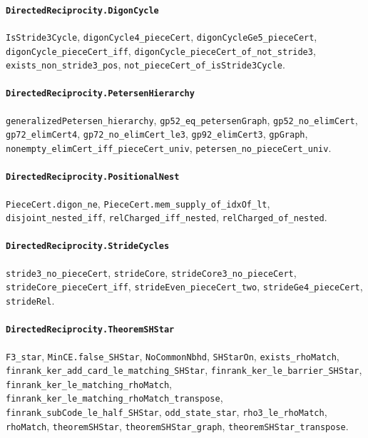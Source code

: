 \paragraph{\texttt{DirectedReciprocity.DigonCycle}}
{\small\raggedright \texttt{IsStride3Cycle}, \texttt{digonCycle4\_pieceCert}, \texttt{digonCycleGe5\_pieceCert}, \texttt{digonCycle\_pieceCert\_iff}, \texttt{digonCycle\_pieceCert\_of\_not\_stride3}, \texttt{exists\_non\_stride3\_pos}, \texttt{not\_pieceCert\_of\_isStride3Cycle}.\par}

\paragraph{\texttt{DirectedReciprocity.PetersenHierarchy}}
{\small\raggedright \texttt{generalizedPetersen\_hierarchy}, \texttt{gp52\_eq\_petersenGraph}, \texttt{gp52\_no\_elimCert}, \texttt{gp72\_elimCert4}, \texttt{gp72\_no\_elimCert\_le3}, \texttt{gp92\_elimCert3}, \texttt{gpGraph}, \texttt{nonempty\_elimCert\_iff\_pieceCert\_univ}, \texttt{petersen\_no\_pieceCert\_univ}.\par}

\paragraph{\texttt{DirectedReciprocity.PositionalNest}}
{\small\raggedright \texttt{PieceCert.digon\_ne}, \texttt{PieceCert.mem\_supply\_of\_idxOf\_lt}, \texttt{disjoint\_nested\_iff}, \texttt{relCharged\_iff\_nested}, \texttt{relCharged\_of\_nested}.\par}

\paragraph{\texttt{DirectedReciprocity.StrideCycles}}
{\small\raggedright \texttt{stride3\_no\_pieceCert}, \texttt{strideCore}, \texttt{strideCore3\_no\_pieceCert}, \texttt{strideCore\_pieceCert\_iff}, \texttt{strideEven\_pieceCert\_two}, \texttt{strideGe4\_pieceCert}, \texttt{strideRel}.\par}

\paragraph{\texttt{DirectedReciprocity.TheoremSHStar}}
{\small\raggedright \texttt{F3\_star}, \texttt{MinCE.false\_SHStar}, \texttt{NoCommonNbhd}, \texttt{SHStarOn}, \texttt{exists\_rhoMatch}, \texttt{finrank\_ker\_add\_card\_le\_matching\_SHStar}, \texttt{finrank\_ker\_le\_barrier\_SHStar}, \texttt{finrank\_ker\_le\_matching\_rhoMatch}, \texttt{finrank\_ker\_le\_matching\_rhoMatch\_transpose}, \texttt{finrank\_subCode\_le\_half\_SHStar}, \texttt{odd\_state\_star}, \texttt{rho3\_le\_rhoMatch}, \texttt{rhoMatch}, \texttt{theoremSHStar}, \texttt{theoremSHStar\_graph}, \texttt{theoremSHStar\_transpose}.\par}

